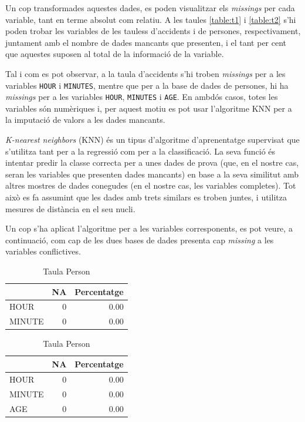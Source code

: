 \documentclass[12pt,longbibliography]{article}
\theoremstyle{definition}
\theoremstyle{remark}
\begin{document}
Un cop transformades aquestes dades, es poden visualitzar els \emph{missings} per cada variable, tant en terme absolut com relatiu. A les taules \ref{table:t1} i \ref{table:t2} s'hi poden trobar les variables de les tauless d'accidents i de persones, respectivament, juntament amb el nombre de dades mancants que presenten, i el tant per cent que aquestes suposen al total de la informació de la variable.


Tal i com es pot observar, a la taula d'accidents s'hi troben \emph{missings} per a les variables \texttt{HOUR} i \texttt{MINUTES}, mentre que per a la base de dades de persones, hi ha \emph{missings} per a les variables \texttt{HOUR}, \texttt{MINUTES} i \texttt{AGE}. En ambdós casos, totes les variables són numèriques i, per aquest motiu es pot usar l'algoritme KNN per a la imputació de valors a les dades mancants.


\emph{K-nearest neighbors} (KNN) és un tipus d'algoritme d'aprenentatge supervisat que s'utilitza tant per a la regressió com per a la classificació. La seva funció és intentar predir la classe correcta per a unes dades de prova (que, en el nostre cas, seran les variables que presenten dades mancants) en base a la seva similitut amb altres mostres de dades conegudes (en el nostre cas, les variables completes). Tot això es fa assumint que les dades amb trets similars es troben juntes, i utilitza mesures de distància en el seu nucli.


Un cop s'ha aplicat l'algoritme per a les variables corresponents, es pot veure, a continuació, com cap de les dues bases de dades presenta cap \textit{missing} a les variables conflictives.




\begin{table}[H]
\parbox{.45\linewidth}{
\centering
\begin{tabular}{l|r|r|}
\cline{2-3}
\textbf{} & \multicolumn{1}{l|}{\textbf{NA}} & \multicolumn{1}{l|}{\textbf{Percentatge}} \\ \hline
\multicolumn{1}{|l|}{HOUR}        & 0 & 0.00 \\ \hline
\multicolumn{1}{|l|}{MINUTE}      & 0 & 0.00 \\ \hline
\end{tabular}
\caption{Taula Accident \label{table:t3}}
}
\hfill
\parbox{.45\linewidth}{
\centering
\begin{tabular}{l|r|r|}
\cline{2-3}
\textbf{} & \multicolumn{1}{l|}{\textbf{NA}} & \multicolumn{1}{l|}{\textbf{Percentatge}} \\ \hline
\multicolumn{1}{|l|}{HOUR}        & 0  & 0.00 \\ \hline
\multicolumn{1}{|l|}{MINUTE}      & 0 & 0.00 \\ \hline
\multicolumn{1}{|l|}{AGE}         & 0 & 0.00 \\ \hline
\end{tabular}
\caption{Taula Person \label{table:t4}}
}
\end{table}
\end{document}
